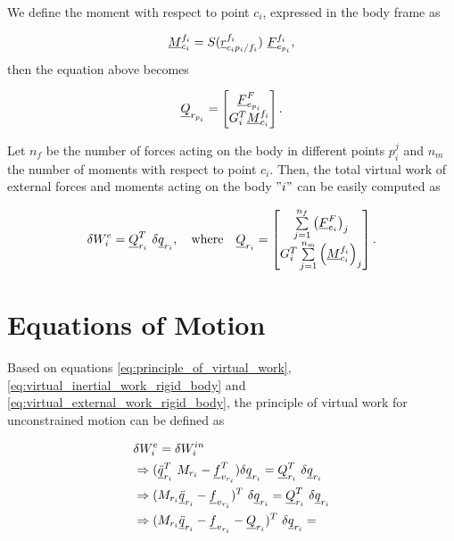We define the moment with respect to point $c_i$, expressed in the body 
frame as 

\[
    \vecd{M}_{c_i}^{f_i} = S(\pvec{r}{c_{i}p_{i}}{f_{i}}{f_{i}})\ \vecd{F}^{f_i}_{e_{p_i}},
\]
then the equation above becomes 

\begin{equation}
    \underline{Q}_{r_{p_i}} = 
    \begin{bmatrix}
        \underline{F}^{F}_{e_{p_i}} \\ G^{T}_{i} \underline{M}_{c_i}^{f_i} 
    \end{bmatrix}.
\end{equation}

Let $n_f$ be the number of forces acting on the body in different points 
$p^{j}_i$ and $n_m$ the number of moments with respect to point $c_i$.
Then, the total virtual work of external forces and moments 
acting on the body $"i"$ can be easily computed as  

\begin{equation}
    \delta W^{e}_{i} = \vecd{Q}^{T}_{r_i}\ \delta \vecd{q}_{r_{i}}, 
    \quad \text{where} \quad 
    \vecd{Q}_{r_i} = 
    \begin{bmatrix}
        \sum\limits_{j=1}^{n_f}\left(\vecd{F}^{F}_{e_i}\right)_j 
        \\ G^{T}_{i} \sum\limits_{j=1}^{n_m}\left(\vecd{M}_{c_i}^{f_i}\right)_j 
    \end{bmatrix}.
    \label{eq:virtual_external_work_rigid_body}
\end{equation}

\section{Equations of Motion} 
Based on equations \eqref{eq:principle_of_virtual_work}, 
\eqref{eq:virtual_inertial_work_rigid_body} and 
\eqref{eq:virtual_external_work_rigid_body}, the principle of virtual 
work for unconstrained motion can be defined as 

\begin{align*}
   & \delta W^{e}_{i} = \delta W^{in}_{i} \\
   & \Rightarrow (\underline{\ddot{q}}_{r_{i}}^{T}\ M_{r_i}  
    - \underline{f}_{v_{r_i}}^{T})\delta\underline{q}_{r_{i}} = 
    \underline{Q}^{T}_{r_i}\ \delta \underline{q}_{r_{i}} \\ 
   & \Rightarrow (M_{r_i}\underline{\ddot{q}}_{r_{i}}   
    - \underline{f}_{v_{r_i}})^{T}\ \delta\underline{q}_{r_{i}} = 
    \underline{Q}^{T}_{r_i}\ \delta \underline{q}_{r_{i}} \\ 
   & \Rightarrow (M_{r_i}\underline{\ddot{q}}_{r_{i}}   
    - \underline{f}_{v_{r_i}}-\underline{Q}_{r_i})^{T}\ \delta\underline{q}_{r_{i}} =  
     \\ 
\end{align*}

